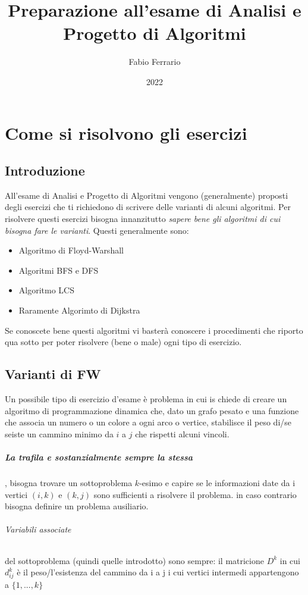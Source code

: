 \documentclass[12pt, a4paper, openany]{book}
\begin{document}
\title{Preparazione all'esame di Analisi e Progetto di Algoritmi}
\author{Fabio Ferrario}
\date{2022}
\maketitle

\chapter{Come si risolvono gli esercizi}
\section{Introduzione}
All'esame di Analisi e Progetto di Algoritmi vengono (generalmente) proposti degli esercizi che ti richiedono di scrivere delle varianti di alcuni algoritmi.
Per risolvere questi esercizi bisogna innanzitutto \emph{sapere bene gli algoritmi di cui bisogna fare le varianti}.
Questi generalmente sono:
\begin{itemize}
	\item Algoritmo di Floyd-Warshall
	\item Algoritmi BFS e DFS
	\item Algoritmo LCS
	\item Raramente Algorimto di Dijkstra
\end{itemize}
Se conoscete bene questi algoritmi vi basterà conoscere i procedimenti che riporto qua sotto per poter risolvere (bene o male) ogni tipo di esercizio.

\section{Varianti di FW}
Un possibile tipo di esercizio d'esame è problema in cui is chiede di creare un algoritmo di programmazione dinamica
che, dato un grafo pesato e una funzione che associa un numero o un colore a ogni arco o vertice, stabilisce {il peso di}/{se seiste} un cammino minimo da $i$ a $j$
che rispetti alcuni vincoli.

\paragraph{La trafila e sostanzialmente sempre la stessa}, bisogna trovare un sottoproblema $k$-esimo e capire se le informazioni date da i vertici $(i,k)$ e $(k,j)$
sono sufficienti a risolvere il problema. in caso contrario bisogna definire un problema ausiliario.

\subparagraph{Variabili associate} del sottoproblema (quindi quelle introdotto) sono sempre: il matricione $D^k$ in cui $d^k_{ij}$ è il peso/l'esistenza del cammino da i a j
i cui vertici intermedi appartengono a $\{1,...,k\}$
\end{document}
